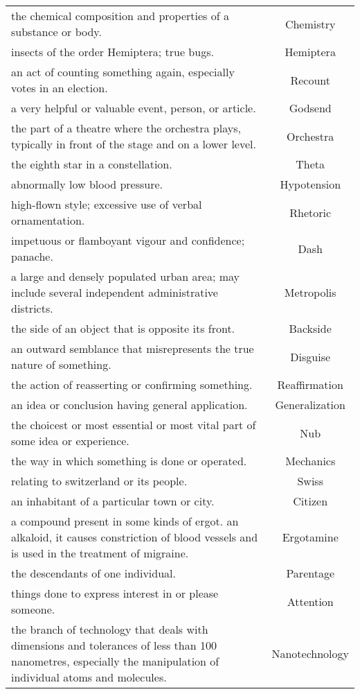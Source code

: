 \documentclass{article}
\begin{document}
\begin{longtable}{p{12cm}c}
the chemical composition and properties of a substance or body. & Chemistry\\
insects of the order Hemiptera; true bugs. & Hemiptera\\
an act of counting something again, especially votes in an election. & Recount\\
a very helpful or valuable event, person, or article. & Godsend\\
the part of a theatre where the orchestra plays, typically in front of the stage and on a lower level. & Orchestra\\
the eighth star in a constellation. & Theta\\
abnormally low blood pressure. & Hypotension\\
high-flown style; excessive use of verbal ornamentation. & Rhetoric\\
impetuous or flamboyant vigour and confidence; panache. & Dash\\
a large and densely populated urban area; may include several independent administrative districts. & Metropolis\\
the side of an object that is opposite its front. & Backside\\
an outward semblance that misrepresents the true nature of something. & Disguise\\
the action of reasserting or confirming something. & Reaffirmation\\
an idea or conclusion having general application. & Generalization\\
the choicest or most essential or most vital part of some idea or experience. & Nub\\
the way in which something is done or operated. & Mechanics\\
relating to switzerland or its people. & Swiss\\
an inhabitant of a particular town or city. & Citizen\\
a compound present in some kinds of ergot. an alkaloid, it causes constriction of blood vessels and is used in the treatment of migraine. & Ergotamine\\
the descendants of one individual. & Parentage\\
things done to express interest in or please someone. & Attention\\
the branch of technology that deals with dimensions and tolerances of less than 100 nanometres, especially the manipulation of individual atoms and molecules. & Nanotechnology\\

\end{longtable}
\end{document}
